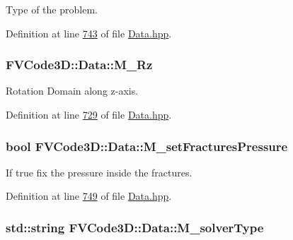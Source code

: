 Type of the problem. 



Definition at line \hyperlink{Data_8hpp_source_l00743}{743} of file \hyperlink{Data_8hpp_source}{Data.\+hpp}.

\subsubsection[{\texorpdfstring{M\+\_\+\+Rz}{M_Rz}}]{ F\+V\+Code3\+D\+::\+Data\+::\+M\+\_\+\+Rz\hspace{0.3cm}{\ttfamily [protected]}}\hypertarget{classFVCode3D_1_1Data_a1268778a4b4532d5760a4bfe5eb97e6f}{}\label{classFVCode3D_1_1Data_a1268778a4b4532d5760a4bfe5eb97e6f}


Rotation Domain along z-\/axis. 



Definition at line \hyperlink{Data_8hpp_source_l00729}{729} of file \hyperlink{Data_8hpp_source}{Data.\+hpp}.

\subsubsection[{\texorpdfstring{M\+\_\+set\+Fractures\+Pressure}{M_setFracturesPressure}}]{\setlength{\rightskip}{0pt plus 5cm}bool F\+V\+Code3\+D\+::\+Data\+::\+M\+\_\+set\+Fractures\+Pressure\hspace{0.3cm}{\ttfamily [protected]}}\hypertarget{classFVCode3D_1_1Data_a50bb4aa8e225203af91e6221e6017549}{}\label{classFVCode3D_1_1Data_a50bb4aa8e225203af91e6221e6017549}


If true fix the pressure inside the fractures. 



Definition at line \hyperlink{Data_8hpp_source_l00749}{749} of file \hyperlink{Data_8hpp_source}{Data.\+hpp}.

\subsubsection[{\texorpdfstring{M\+\_\+solver\+Type}{M_solverType}}]{\setlength{\rightskip}{0pt plus 5cm}std\+::string F\+V\+Code3\+D\+::\+Data\+::\+M\+\_\+solver\+Type\hspace{0.3cm}{\ttfamily [protected]}}\hypertarget{classFVCode3D_1_1Data_a38b6dc5c0b7c6f4734be7b60b231e56b}{}\label{classFVCode3D_1_1Data_a38b6dc5c0b7c6f4734be7b60b231e56b}


